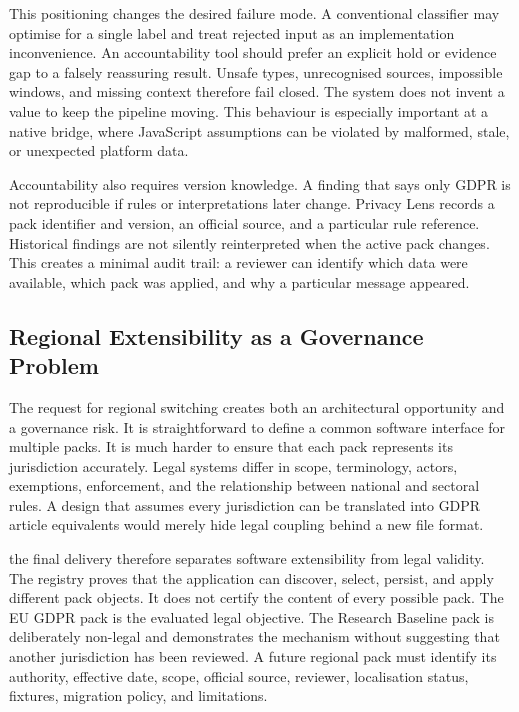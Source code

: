 This positioning changes the desired failure mode. A conventional classifier may optimise for a single label and treat rejected input as an implementation inconvenience. An accountability tool should prefer an explicit hold or evidence gap to a falsely reassuring result. Unsafe types, unrecognised sources, impossible windows, and missing context therefore fail closed. The system does not invent a value to keep the pipeline moving. This behaviour is especially important at a native bridge, where JavaScript assumptions can be violated by malformed, stale, or unexpected platform data.

Accountability also requires version knowledge. A finding that says only GDPR is not reproducible if rules or interpretations later change. Privacy Lens records a pack identifier and version, an official source, and a particular rule reference. Historical findings are not silently reinterpreted when the active pack changes. This creates a minimal audit trail: a reviewer can identify which data were available, which pack was applied, and why a particular message appeared.

\subsection{Regional Extensibility as a Governance Problem}

The request for regional switching creates both an architectural opportunity and a governance risk. It is straightforward to define a common software interface for multiple packs. It is much harder to ensure that each pack represents its jurisdiction accurately. Legal systems differ in scope, terminology, actors, exemptions, enforcement, and the relationship between national and sectoral rules. A design that assumes every jurisdiction can be translated into GDPR article equivalents would merely hide legal coupling behind a new file format.

the final delivery therefore separates software extensibility from legal validity. The registry proves that the application can discover, select, persist, and apply different pack objects. It does not certify the content of every possible pack. The EU GDPR pack is the evaluated legal objective. The Research Baseline pack is deliberately non-legal and demonstrates the mechanism without suggesting that another jurisdiction has been reviewed. A future regional pack must identify its authority, effective date, scope, official source, reviewer, localisation status, fixtures, migration policy, and limitations.

